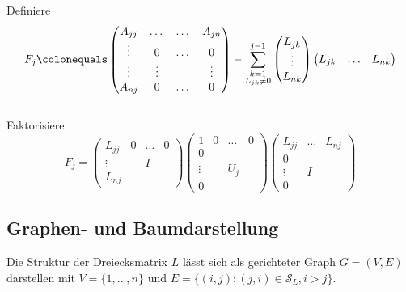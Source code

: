 \begin{algorithm}[H]
 \SetAlgoLined

 {
 Definiere
 \begin{equation*}
  F_j
  \colonequals
  \begin{pmatrix}
   A_{jj} & \dots & \dots & A_{jn} \\
   \vdots & 0 & \dots & 0 \\
   \vdots & \vdots & & \vdots \\
   A_{nj} & 0 & \dots & 0
  \end{pmatrix}
  -
  \sum_{\substack{k=1 \\ L_{jk} \neq 0}}^{j-1}
  \begin{pmatrix}
   L_{jk} \\
   \vdots \\
   L_{nk}
  \end{pmatrix}
  \begin{pmatrix}
   L_{jk} & \ldots & L_{nk}
  \end{pmatrix}
  \end{equation*}
 \\
 Faktorisiere
 \begin{equation*}
  F_j
  =
  \begin{pmatrix}
   L_{jj} & 0 & \dots & 0 \\
   \vdots & & I & \\
   L_{nj} & & &
  \end{pmatrix}
  \begin{pmatrix}
   1 & 0 & \dots & 0 \\
   0 \\
   \vdots & & \overline{U}_j \\
   0
  \end{pmatrix}
  \begin{pmatrix}
   L_{jj} & \dots & L_{nj} \\
   0 \\
   \vdots & I & \\
   0 & &
  \end{pmatrix}
 \end{equation*}
 }
\end{algorithm}


\subsection{Graphen- und Baumdarstellung}

Die Struktur der Dreiecksmatrix $L$ lässt sich als gerichteter Graph $G=(V,E)$ darstellen mit
$V=\lbrace 1,\ldots,n \rbrace$ und $E=\lbrace (i,j) \colon (j,i) \in \mathcal{S}_L,i>j \rbrace$.

